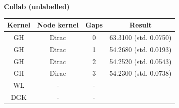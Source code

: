 \documentclass{article}
\begin{document}
\textbf{Collab (unlabelled)}\\
\begin{minipage}{0.6\linewidth}
	\hspace*{-1in}

	\label{fig:collab_unlabelled}
\end{minipage}
\begin{minipage}[c]{0.5\linewidth}
	
	\centering
	\begin{tabular}{c|c|c|c}
		Kernel & Node kernel & Gaps & Result\\
		\hline
		GH & Dirac & 0 & 63.3100 (std. 0.0750) \\
		GH & Dirac & 1 & 54.2680 (std. 0.0193) \\
		GH & Dirac & 2 & 54.2520 (std. 0.0543) \\
		GH & Dirac & 3 & 54.2300 (std. 0.0738) \\
		WL & - & - & \\
		DGK & - & - &
	\end{tabular}
	\label{table:collab_unlabelled}
\end{minipage}
\end{document}

